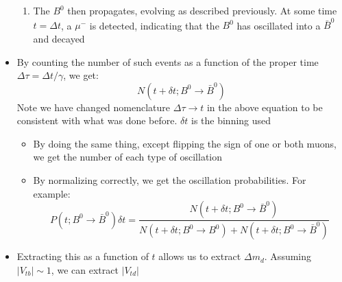 \begin{itemize}
\begin{enumerate}
    \item The $B^0$ then propagates, evolving as described previously. At some time $t=\Delta t$, a $\mu^-$ is detected, indicating that the $B^0$ has oscillated into a $\bar B^0$ and decayed
  \end{enumerate}
  \item By counting the number of such events as a function of the proper time $\Delta \tau = \Delta t/\gamma$, we get:
  \begin{equation}
    N (t+\delta t; B^0 \rightarrow \bar B^0)
  \end{equation}
  Note we have changed nomenclature $\Delta \tau \rightarrow t$ in the above equation to be consistent with what was done before. $\delta t$ is the binning used
  \begin{itemize}
    \item By doing the same thing, except flipping the sign of one or both muons, we get the number of each type of oscillation
    \item By normalizing correctly, we get the oscillation probabilities. For example:
    \begin{equation}
      P(t;  B^0 \rightarrow \bar B^0)\delta t = \frac{ N (t+\delta t; B^0 \rightarrow \bar B^0) }{ N (t+\delta t; B^0 \rightarrow B^0) + N (t+\delta t; B^0 \rightarrow \bar B^0) }
    \end{equation}
  \end{itemize}
  \item Extracting this as a function of $t$ allows us to extract $\Delta m_d$. Assuming $|V_{tb}|\sim 1$, we can extract $|V_{td}|$
\end{itemize}

